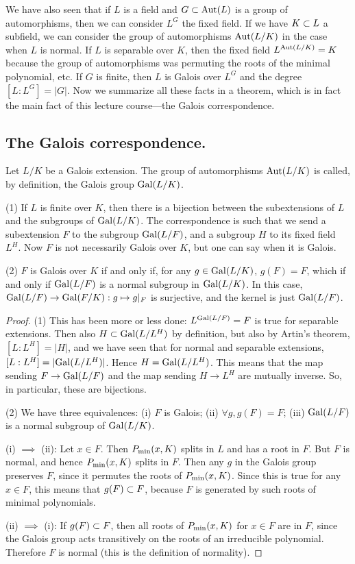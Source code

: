 We have also seen that if $L$ is a field and $G \subset \mathrm{Aut}(L)$ is a group of automorphisms, then we can consider $L^G$ the fixed field.
If we have $K \subset L$ a subfield, we can consider the group of automorphisms $\mathrm{Aut}(L/K)$ in the case when $L$ is normal.
If $L$ is separable over $K$, then the fixed field $L^{\mathrm{Aut}(L/K)} = K$ because the group of automorphisms was permuting the roots of the minimal polynomial, etc.
If $G$ is finite, then $L$ is Galois over $L^G$ and the degree $[L:L^G] = |G|$.
Now we summarize all these facts in a theorem, which is in fact the main fact of this lecture course---the Galois correspondence.

\subsection{The Galois correspondence.}
Let $L / K$ be a Galois extension.
The group of automorphisms $\mathrm{Aut}(L/K)$ is called, by definition, the Galois group $\mathrm{Gal}(L/K)$.

\begin{thm}[Galois]
(1) If $L$ is finite over $K$, then there is a bijection between the subextensions of $L$ and the subgroups of $\mathrm{Gal}(L/K)$.
The correspondence is such that we send a subextension $F$ to the subgroup $\mathrm{Gal}(L/F)$, and a subgroup $H$ to its fixed field $L^H$.
Now $F$ is not necessarily Galois over $K$, but one can say when it is Galois.

(2) $F$ is Galois over $K$ if and only if, for any $g \in \mathrm{Gal}(L/K)$, $g(F) = F$, which if and only if $\mathrm{Gal}(L/F)$ is a normal subgroup in $\mathrm{Gal}(L/K)$.
In this case, $\mathrm{Gal}(L/F) \to \mathrm{Gal}(F/K): g \mapsto g|_F$ is surjective, and the kernel is just $\mathrm{Gal}(L/F)$.
\end{thm}
\begin{proof}
(1) This has been more or less done: $L^{\mathrm{Gal}(L/F)} = F$ is true for separable extensions.
Then also $H \subset \mathrm{Gal}(L/L^H)$ by definition, but also by Artin's theorem, $[L : L^H] = |H|$, and we have seen that for normal and separable extensions, $[L:L^H] = |\mathrm{Gal}(L/L^H)|$.
Hence $H = \mathrm{Gal}(L/L^H)$.
This means that the map sending $F \to \mathrm{Gal}(L / F)$ and the map sending $H \to L^H$ are mutually inverse.
So, in particular, these are bijections.

(2) We have three equivalences: (i) $F$ is Galois; (ii) $\forall g, g(F) = F$; (iii) $\mathrm{Gal}(L / F)$ is a normal subgroup of $\mathrm{Gal}(L/K)$.

(i) $\implies$ (ii): Let $x \in F$. Then $P_{\mathrm{min}}(x, K)$ splits in $L$ and has a root in $F$.
But $F$ is normal, and hence $P_{\mathrm{min}}(x, K)$ splits in $F$.
Then any $g$ in the Galois group preserves $F$, since it permutes the roots of $P_{\mathrm{min}}(x, K)$.
Since this is true for any $x \in F$, this means that $g(F) \subset F$, because $F$ is generated by such roots of minimal polynomials.

(ii) $\implies$ (i): If $g(F) \subset F$, then all roots of $P_{\mathrm{min}}(x, K)$ for $x \in F$ are in $F$, since the Galois group acts transitively on the roots of an irreducible polynomial.
Therefore $F$ is normal (this is the definition of normality).



\end{proof}

